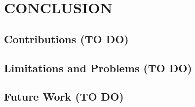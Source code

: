 \chapter{CONCLUSION}
\label{ch:conclusion}

\section{Contributions (TO DO)}

\section{Limitations and Problems (TO DO)}

\section{Future Work (TO DO)}